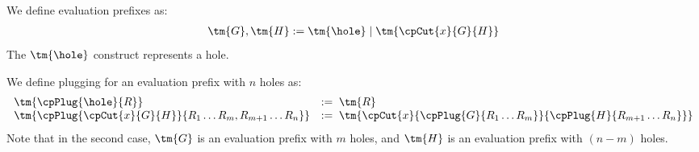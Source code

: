 \begin{definition}\label{def:cp-evaluation-prefixes}
  We define evaluation prefixes as:
  \begin{align*}
    \tm{G}, \tm{H} := \tm{\hole} \mid \tm{\cpCut{x}{G}{H}}
  \end{align*}
  The $\tm{\hole}$ construct represents a hole.
\end{definition}
\begin{definition}[Plugging]\label{def:cp-evaluation-prefix-plugging}
  We define plugging for an evaluation prefix with $n$ holes as:
  \begin{gather*}
    \begin{array}{ll}
      \tm{\cpPlug{\hole}{R}} & := \; \tm{R} \\
      \tm{\cpPlug{\cpCut{x}{G}{H}}{R_1 \dots R_m, R_{m+1} \dots R_{n}}}
                            & := \; \tm{\cpCut{x}{\cpPlug{G}{R_1 \dots R_m}}{\cpPlug{H}{R_{m+1} \dots R_n}}}
    \end{array}
  \end{gather*}
  Note that in the second case, $\tm{G}$ is an evaluation prefix with $m$ holes,
  and $\tm{H}$ is an evaluation prefix with $(n-m)$ holes.
\end{definition}
